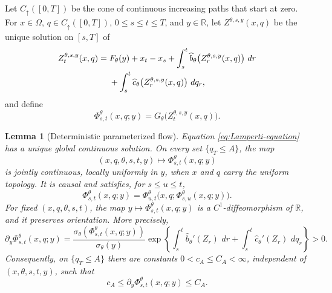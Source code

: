 \documentclass[11pt,reqno]{amsart}
\theoremstyle{plain}
\newtheorem{lemma}[lemma]{Lemma}
\theoremstyle{definition}
\newcommand{\R}{\mathbb R}
\newcommand{\dd}{\,d}
\begin{document}
Let \(C_\uparrow([0,T])\) be the cone of continuous increasing paths that
start at zero.  For \(x\in\Omega\), \(q\in C_\uparrow([0,T])\),
\(0\le s\le t\le T\), and \(y\in\R\), let
\(Z^{\theta,s,y}(x,q)\) be the unique solution on \([s,T]\) of
\begin{align}
  Z_t^{\theta,s,y}(x,q)
  ={}&F_\theta(y)+x_t-x_s
  +\int_s^t\widehat b_\theta
       \bigl(Z_r^{\theta,s,y}(x,q)\bigr)\,\dd r
  \notag\\
  &+\int_s^t\widehat c_\theta
       \bigl(Z_r^{\theta,s,y}(x,q)\bigr)\,\dd q_r,
  \label{eq:Lamperti-equation}
\end{align}
and define
\begin{equation}\label{eq:Phi-flow}
  \Phi_{s,t}^\theta(x,q;y)
  =G_\theta\bigl(Z_t^{\theta,s,y}(x,q)\bigr).
\end{equation}

\begin{lemma}[Deterministic parameterized flow]
\label{lem:deterministic-flow}
Equation \eqref{eq:Lamperti-equation} has a unique global continuous
solution.  On every set \(\{q_T\le A\}\), the map
\begin{equation}\label{eq:joint-flow-continuity}
  (x,q,\theta,s,t,y)
  \longmapsto
  \Phi_{s,t}^\theta(x,q;y)
\end{equation}
is jointly continuous, locally uniformly in \(y\), when \(x\) and \(q\)
carry the uniform topology.  It is causal and satisfies, for
\(s\le u\le t\),
\begin{equation}\label{eq:cocycle}
  \Phi_{s,t}^\theta(x,q;y)
  =
  \Phi_{u,t}^\theta
  \bigl(x,q;\Phi_{s,u}^\theta(x,q;y)\bigr).
\end{equation}
For fixed \((x,q,\theta,s,t)\), the map
\(y\mapsto\Phi_{s,t}^\theta(x,q;y)\) is a \(C^1\)-diffeomorphism of
\(\R\), and it preserves orientation.  More precisely,
\begin{equation}\label{eq:flow-derivative}
  \partial_y\Phi_{s,t}^\theta(x,q;y)
  =
  \frac{\sigma_\theta(\Phi_{s,t}^\theta(x,q;y))}
       {\sigma_\theta(y)}
  \exp\!\left\{
    \int_s^t\widehat b_\theta'(Z_r)\,\dd r
    +\int_s^t\widehat c_\theta'(Z_r)\,\dd q_r
  \right\}>0.
\end{equation}
Consequently, on \(\{q_T\le A\}\) there are constants
\(0<c_A\le C_A<\infty\), independent of
\((x,\theta,s,t,y)\), such that
\begin{equation}\label{eq:flow-bi-Lipschitz}
  c_A\le\partial_y\Phi_{s,t}^\theta(x,q;y)\le C_A.
\end{equation}
\end{lemma}
\end{document}
